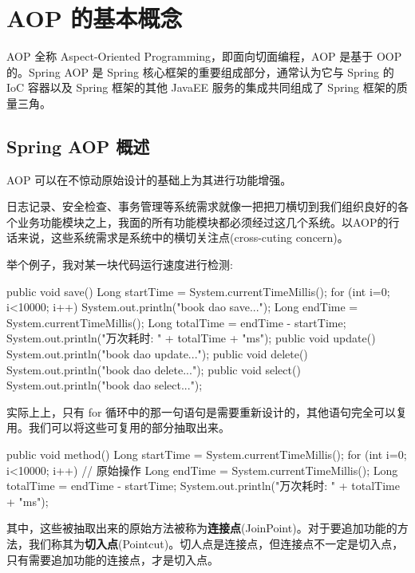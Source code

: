 \section{AOP 的基本概念}

AOP 全称 Aspect-Oriented Programming，即面向切面编程，AOP 是基于 OOP 的。Spring AOP 是 Spring 核心框架的重要组成部分，通常认为它与 Spring 的 IoC 容器以及 Spring 框架的其他 JavaEE 服务的集成共同组成了 Spring 框架的质量三角。

\subsection{Spring AOP 概述}

AOP 可以在不惊动原始设计的基础上为其进行功能增强。

日志记录、安全检查、事务管理等系统需求就像一把把刀横切到我们组织良好的各个业务功能模块之上，我面的所有功能模块都必须经过这几个系统。以AOP的行话来说，这些系统需求是系统中的横切关注点(cross-cuting concern)。

举个例子，我对某一块代码运行速度进行检测:

\begin{Java}
public void save() {
    Long startTime = System.currentTimeMillis();
    for (int i=0; i<10000; i++) {
        System.out.println("book dao save...");
    }
    Long endTime = System.currentTimeMillis();
    Long totalTime = endTime - startTime;
    System.out.println("万次耗时: " + totalTime + "ms");
}
public void update() {
    System.out.println("book dao update...");
}
public void delete() {
    System.out.println("book dao delete...");
}
public void select() {
    System.out.println("book dao select...");
}
\end{Java}

实际上上，只有 for 循环中的那一句语句是需要重新设计的，其他语句完全可以复用。我们可以将这些可复用的部分抽取出来。

\begin{Java}
public void method() {
    Long startTime = System.currentTimeMillis();
    for (int i=0; i<10000; i++) {
        // 原始操作
    }
    Long endTime = System.currentTimeMillis();
    Long totalTime = endTime - startTime;
    System.out.println("万次耗时: " + totalTime + "ms");
}
\end{Java}

其中，这些被抽取出来的原始方法被称为\textbf{连接点}(JoinPoint)。对于要追加功能的方法，我们称其为\textbf{切入点}(Pointcut)。切人点是连接点，但连接点不一定是切入点，只有需要追加功能的连接点，才是切入点。

